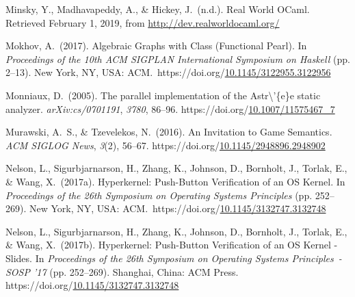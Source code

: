 \documentclass[12pt,twoside]{article}
\begin{document}
{\begin{thebibliography}{222}
\mdbibitemlabel{}Minsky, Y., Madhavapeddy, A., \& Hickey, J.~(n.d.). Real World OCaml. Retrieved February 1, 2019, from \href{http://dev.realworldocaml.org/}{{\ttfamily http://\hspace{0pt}dev.\hspace{0pt}realworldocaml.\hspace{0pt}org/\hspace{0pt}}}\label{minsky_real_nodate}%

\mdbibitemlabel{}Mokhov, A.~(2017). Algebraic Graphs with Class (Functional Pearl). In \emph{Proceedings of the 10th ACM SIGPLAN International Symposium on Haskell} (pp. 2–13). New York, NY, USA: ACM.~https://doi.org/\href{https://dx.doi.org/10.1145/3122955.3122956}{10.1145/3122955.3122956}\label{mokhov_algebraic_2017}%

\mdbibitemlabel{}Monniaux, D.~(2005). The parallel implementation of the Astr\textbackslash{}’\{e\}e static analyzer. \emph{arXiv:cs/0701191}, \emph{3780}, 86–96. https://doi.org/\href{https://dx.doi.org/10.1007/11575467_7}{10.1007/11575467\_7}\label{monniaux_parallel_2005}%

\mdbibitemlabel{}Murawski, A.~S., \& Tzevelekos, N.~(2016). An Invitation to Game Semantics. \emph{ACM SIGLOG News}, \emph{3}(2), 56–67. https://doi.org/\href{https://dx.doi.org/10.1145/2948896.2948902}{10.1145/2948896.2948902}\label{murawski_invitation_2016}%

\mdbibitemlabel{}Nelson, L., Sigurbjarnarson, H., Zhang, K., Johnson, D., Bornholt, J., Torlak, E., \& Wang, X.~(2017a). Hyperkernel: Push-Button Verification of an OS Kernel. In \emph{Proceedings of the 26th Symposium on Operating Systems Principles} (pp. 252–269). New York, NY, USA: ACM.~https://doi.org/\href{https://dx.doi.org/10.1145/3132747.3132748}{10.1145/3132747.3132748}\label{nelson_hyperkernel:_2017}%

\mdbibitemlabel{}Nelson, L., Sigurbjarnarson, H., Zhang, K., Johnson, D., Bornholt, J., Torlak, E., \& Wang, X.~(2017b). Hyperkernel: Push-Button Verification of an OS Kernel - Slides. In \emph{Proceedings of the 26th Symposium on Operating Systems Principles~- SOSP ’17} (pp. 252–269). Shanghai, China: ACM Press. https://doi.org/\href{https://dx.doi.org/10.1145/3132747.3132748}{10.1145/3132747.3132748}\label{nelson_hyperkernel:_2017-1}%


\end{thebibliography}}
\end{document}
